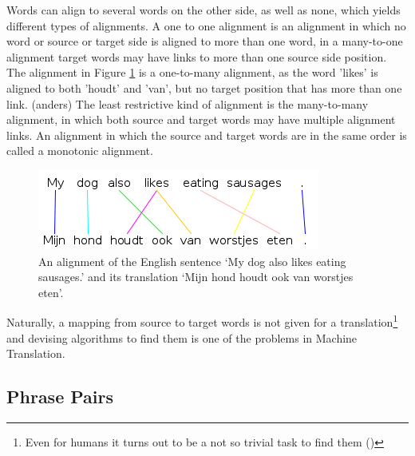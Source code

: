 \documentclass{report}
\theoremstyle{definition}
\theoremstyle{plain}
\begin{document}
Words can align to several words on the other side, as well as none, which yields different types of alignments. A one to one alignment is an alignment in which no word or source or target side is aligned to more than one word, in a many-to-one alignment target words may have links to more than one source side position. The alignment in Figure \ref{fig:alignment} is a one-to-many alignment, as the word 'likes' is aligned to both 'houdt' and 'van', but no target position that has more than one link. (anders) The least restrictive kind of alignment is the many-to-many alignment, in which both source and target words may have multiple alignment links. An alignment in which the source and target words are in the same order is called a monotonic alignment. 

\begin{figure}[!ht]
\centering
\includegraphics[scale=0.6]{alignment.png}
\caption{An alignment of the English sentence `My dog also likes eating sausages.' and its translation `Mijn hond houdt ook van worstjes eten'.%
}\label{fig:alignment}
\end{figure}

Naturally, a mapping from source to target words is not given for a translation\footnote{Even for humans it turns out to be a not so trivial task to find them (\cite{och2000improved})} and devising algorithms to find them is one of the problems in Machine Translation.


\subsection{Phrase Pairs}
\end{document}
